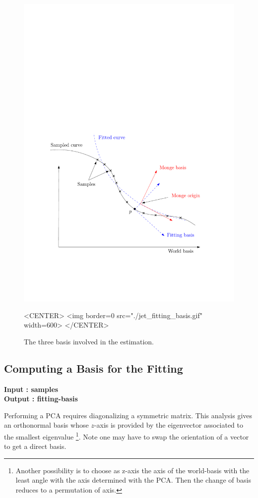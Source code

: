 \begin{figure}[!ht]
\begin{ccTexOnly}
\centerline{
\includegraphics[width=.5\linewidth]{Jet_fitting_3/jet_fitting_basis}}
\end{ccTexOnly}

\label{fig:jet_fitting_basis}
\caption{The three basis involved in the estimation.}

\begin{ccHtmlOnly}
<CENTER>
<img border=0 src="./jet_fitting_basis.gif" width=600>
</CENTER>
\end{ccHtmlOnly}
\end{figure}

\subsection{Computing a Basis for the Fitting}

{\bf Input : samples\\ Output : fitting-basis}


%
%
Performing a PCA requires diagonalizing a symmetric matrix.  This
analysis gives an orthonormal basis whose $z$-axis is provided by the
eigenvector associated to the smallest eigenvalue
\footnote{Another possibility is to choose as z-axis the axis of the
world-basis with the least angle with the axis determined with the
PCA. Then the change of basis reduces to a permutation of axis.}. Note
one may have to swap the orientation of a vector to get a direct
basis.

